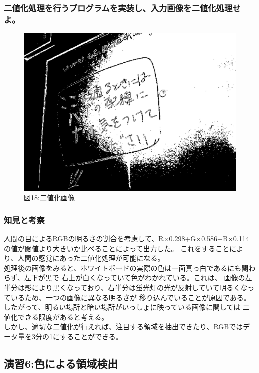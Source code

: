 ﻿\documentclass[a4j,11pt]{jarticle}
\begin{document}
\subsubsection{二値化処理を行うプログラムを実装し、入力画像を二値化処理せよ。}
\clearpage
\begin{figure}[tb]

 \center
 \includegraphics[width=0.8\hsize]{./eps/binarize-00.eps}
 \\図18:二値化画像
 \label{fig:affine1}

 \label{fig:affine2}
\end{figure}
\subsubsection{知見と考察}
人間の目によるRGBの明るさの割合を考慮して、R$\times$0.298+G$\times$0.586+B$\times$0.114の値が閾値より大きいか比べることによって出力した。
これをすることにより、人間の感覚にあった二値化処理が可能になる。\\
処理後の画像をみると、ホワイトボードの実際の色は一面真っ白であるにも関わらず、左下が黒で
右上が白くなっていて色がわかれている。これは、
画像の左半分は影により黒くなっており、右半分は蛍光灯の光が反射していて明るくなっているため、一つの画像に異なる明るさが
移り込んでいることが原因である。したがって、明るい場所と暗い場所がいっしょに映っている画像に関しては
二値化できる限度があると考える。\\
しかし、適切な二値化が行えれば、注目する領域を抽出できたり、RGBではデータ量を3分の1にすることができる。
\subsection{演習6:色による領域検出}
\end{document}
